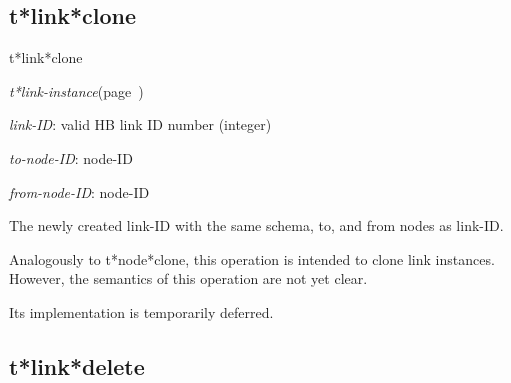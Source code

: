 \subsection{t*link*clone}
\label{t*link*clone}

\begin{description}
\item [Name:]  t*link*clone   

\item [Class:] {\sl t*link-instance}\hfill(page~\pageref{t*link-instance})

\item [Parameters:]
\item {\sl link-ID}:  
valid HB link ID number (integer)

\item {\sl to-node-ID}:  node-ID


\item {\sl from-node-ID}:  node-ID


\item [Return-value:]
The newly created link-ID with the same schema, 
to, and from nodes as link-ID.

\item [Description:]

Analogously to t*node*clone, this operation is
intended to clone link instances. However, the 
semantics of this operation are not yet clear.

Its implementation is temporarily deferred.

\item [Public:]



\end{description}
\horizontalline

\subsection{t*link*delete}
\label{t*link*delete}

